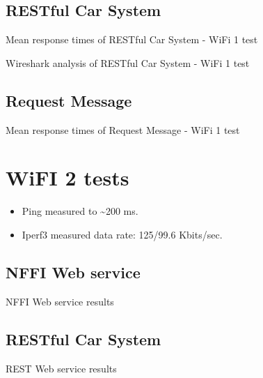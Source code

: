 \begin{appendices}
\subsection{RESTful Car System}

\begin{table}[H]

\caption{Mean response times of RESTful Car System - WiFi 1 test}
\end{table}

\begin{table}[H]

\caption{Wireshark analysis of RESTful Car System - WiFi 1 test}
\end{table}


\subsection{Request Message}
\begin{table}[H]

\caption{Mean response times of Request Message - WiFi 1 test}
\end{table}


\section{WiFI 2 tests}

\begin{itemize}
	\item Ping measured to \textasciitilde 200 ms.
	\item Iperf3 measured data rate: 125/99.6 Kbits/sec.
\end{itemize}

\subsection{NFFI Web service}

\begin{table}[H]

\caption{NFFI Web service results}
\end{table}

\subsection{RESTful Car System}

\begin{table}[H]

\caption{REST Web service results}
\end{table}


\end{appendices}
